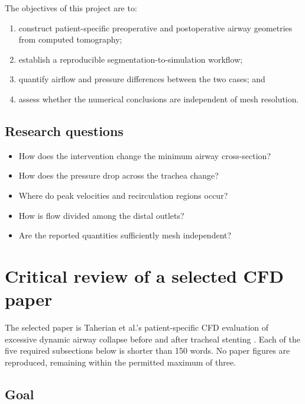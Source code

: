 \documentclass[11pt,a4paper]{article}
\begin{document}
The objectives of this project are to:

\begin{enumerate}[label=\arabic*.]
  \item construct patient-specific preoperative and postoperative airway
        geometries from computed tomography;
  \item establish a reproducible segmentation-to-simulation workflow;
  \item quantify airflow and pressure differences between the two cases; and
  \item assess whether the numerical conclusions are independent of mesh
        resolution.
\end{enumerate}

\subsection{Research questions}

\begin{itemize}
  \item How does the intervention change the minimum airway cross-section?
  \item How does the pressure drop across the trachea change?
  \item Where do peak velocities and recirculation regions occur?
  \item How is flow divided among the distal outlets?
  \item Are the reported quantities sufficiently mesh independent?
\end{itemize}

\section{Critical review of a selected CFD paper}
\label{sec:paper_review}

The selected paper is Taherian et al.'s patient-specific CFD evaluation of
excessive dynamic airway collapse before and after tracheal stenting
\cite{taherian2017}. Each of the five required subsections below is shorter than
150 words. No paper figures are reproduced, remaining within the permitted
maximum of three.

\subsection{Goal}
\end{document}
